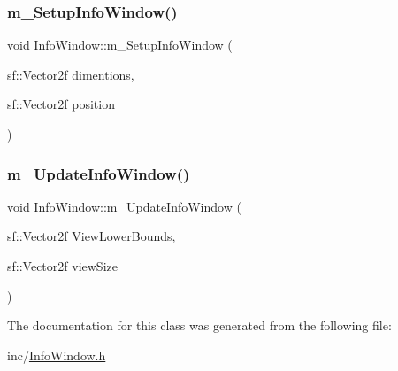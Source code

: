 \subsubsection{\texorpdfstring{m\+\_\+\+Setup\+Info\+Window()}{m\_SetupInfoWindow()}}
{\footnotesize\ttfamily void Info\+Window\+::m\+\_\+\+Setup\+Info\+Window (\begin{DoxyParamCaption}\item[{sf\+::\+Vector2f}]{dimentions,  }\item[{sf\+::\+Vector2f}]{position }\end{DoxyParamCaption})}

\mbox{\label{class_info_window_a3b63c075f8c26f96d2569b163a7dfde9}} 
\subsubsection{\texorpdfstring{m\+\_\+\+Update\+Info\+Window()}{m\_UpdateInfoWindow()}}
{\footnotesize\ttfamily void Info\+Window\+::m\+\_\+\+Update\+Info\+Window (\begin{DoxyParamCaption}\item[{sf\+::\+Vector2f}]{View\+Lower\+Bounds,  }\item[{sf\+::\+Vector2f}]{view\+Size }\end{DoxyParamCaption})}



The documentation for this class was generated from the following file\+:\begin{DoxyCompactItemize}
\item 
inc/\mbox{\hyperlink{_info_window_8h}{Info\+Window.\+h}}\end{DoxyCompactItemize}
